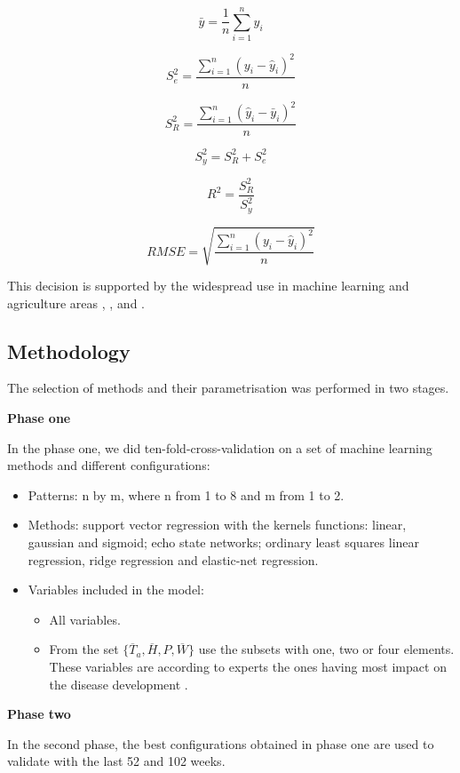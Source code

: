 \documentclass[review]{elsarticle}
\begin{document}
$$ \bar{y} = \frac{1}{n} \sum_{i=1}^{n} y_i $$

$$ S_e^2 = \frac{\sum_{i=1}^{n} {(y_i-\hat{y}_i)}^2 }{n}$$

$$ S_R^2 = \frac{\sum_{i=1}^{n} {(\hat{y}_i-\bar{y}_i)}^2 }{n}$$

$$ S_y^2 = S_R^2 + S_e^2$$

$$ R^2 = \frac{S_R^2}{S_y^2}$$

$$ RMSE = \sqrt{\frac{\sum_{i=1}^{n} {(y_i-\hat{y}_i)}^2 }{n}}$$
	
This decision is supported by the widespread use in machine learning and agriculture areas \citep{Soares2014}, \citep{Soares2013}, \citep{Ibrahim2014} and \citep{Demir2014}.  

\subsection{Methodology}
The selection of methods and their parametrisation was performed in two stages.

{\bf Phase one } 

In the phase one, we did ten-fold-cross-validation on a set of  machine learning methods and different configurations:

\begin{itemize}
\item 	Patterns: n by m, where n from 1 to 8 and m from 1 to 2.

\item Methods: support vector regression with the kernels functions: linear, gaussian and sigmoid; echo state networks; ordinary least squares linear regression, ridge regression and elastic-net regression.

\item Variables included in the model:
\begin{itemize}
\item All variables.
\item From the set $\{ \overline{T}_{a} , \overline{H}, P , \overline{W}  \}$ use the subsets with one, two or four elements. These variables are according to experts the ones having most impact on the disease development \citep{MarinVargas1995}.
\end{itemize}

\end{itemize}

{\bf Phase two }	

In the second phase, the best configurations obtained in phase one are used to validate with the last 52 and 102 weeks. 
\end{document}
